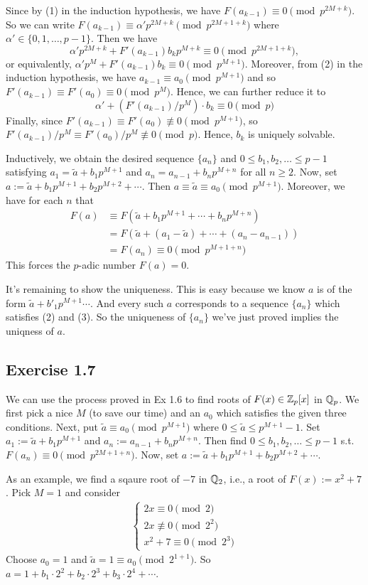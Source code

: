 \documentclass[../Koblitz.tex]{subfiles}
\begin{document}
Since by (1) in the induction hypothesis, we have $F(a_{k-1})\equiv 0 \pmod{p^{2M+k}}$. So we can write $F(a_{k-1}) \equiv \alpha'p^{2M+k} \pmod{p^{2M+1+k}}$ where
$\alpha'\in\{0,1,\ldots,p-1\}$. Then we have $$\alpha'p^{2M+k}+F'(a_{k-1})b_kp^{M+k} \equiv 0\pmod{p^{2M+1+k}},$$ or equivalently, $\alpha'p^M+F'(a_{k-1})b_k \equiv0 \pmod{p^{M+1}}$. Moreover, from (2) in the induction hypothesis, we have $a_{k-1}\equiv a_0 \pmod{p^{M+1}}$ and so $F'(a_{k-1})\equiv F'(a_0)\equiv 0 \pmod{p^M}$. Hence, we can further reduce it to $$\alpha'+(F'(a_{k-1})/p^M)\cdot b_k \equiv 0\pmod{p}$$ Finally, since $F'(a_{k-1})\equiv F'(a_0)\not\equiv 0 \pmod{p^{M+1}}$, so $F'(a_{k-1})/p^M \equiv F'(a_0)/p^M\not\equiv 0 \pmod{p}$. Hence, $b_k$ is uniquely solvable.

Inductively, we obtain the desired sequence $\{a_n\}$ and $0\leq b_1,b_2,\ldots \leq p-1$ satisfying $a_1=\tilde{a}+b_1p^{M+1}$ and $a_n=a_{n-1}+b_np^{M+n}$ for all $n\geq2$. Now, set $a:=\tilde{a}+b_1p^{M+1}+b_2p^{M+2}+\cdots$. Then $a\equiv \tilde{a} \equiv a_0\pmod{p^{M+1}}$. Moreover, we have for each $n$ that
\begin{align*}
F(a) &\equiv F(\tilde{a}+b_1p^{M+1}+\cdots+b_np^{M+n}) \\
&= F(\tilde{a}+(a_1-\tilde{a})+\cdots+(a_n-a_{n-1})) \\
&= F(a_n) \equiv 0 \pmod{p^{M+1+n}}
\end{align*}
This forces the $p$-adic number $F(a)=0$.

It's remaining to show the uniqueness. This is easy because we know $a$ is of the form $\tilde{a}+b'_1p^{M+1}\cdots$. And every such $a$ corresponds to a sequence $\{a_n\}$ which satisfies (2) and (3). So the uniqueness of $\{a_n\}$ we've just proved implies the uniqness of $a$.

\subsection*{Exercise 1.7}

We can use the process proved in Ex 1.6 to find roots of $F(x)\in\mathbb{Z}_p[x]$ in $\mathbb{Q}_p$. We first pick a nice $M$ (to save our time) and an $a_0$ which satisfies the given three conditions. Next, put $\tilde{a}\equiv a_0 \pmod{p^{M+1}}$ where $0\leq \tilde{a} \leq p^{M+1}-1$. Set $a_1:=\tilde{a}+b_1p^{M+1}$ and $a_n:=a_{n-1}+b_np^{M+n}$. Then find $0\leq b_1,b_2,\ldots \leq p-1$ s.t. $F(a_n)\equiv 0\pmod{p^{2M+1+n}}$. Now, set $a:=\tilde{a}+b_1p^{M+1}+b_2p^{M+2}+\cdots$.

As an example, we find a sqaure root of $-7$ in $\mathbb{Q}_2$, i.e., a root of $F(x):=x^2+7$. Pick $M=1$ and consider
\begin{align*}
\begin{cases*}
2x\equiv 0 \pmod{2} \\
2x\not\equiv 0 \pmod{2^2} \\
x^2+7\equiv 0 \pmod{2^3}
\end{cases*}
\end{align*}
Choose $a_0=1$ and $\tilde{a}=1\equiv a_0 \pmod{2^{1+1}}$. So $a=1+b_1\cdot2^2+b_2\cdot2^3+b_3\cdot2^4+\cdots$.
\end{document}

